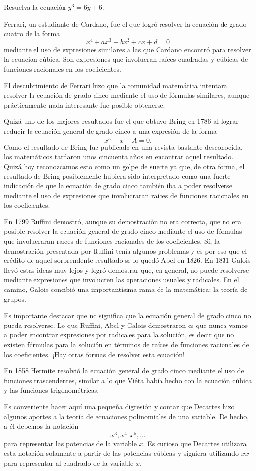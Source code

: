\begin{exercise}
	Resuelva la ecuación $y^3=6y+6$.	
\end{exercise}

Ferrari, un estudiante de Cardano, fue el que logró resolver la
ecuación de grado cuatro de la forma
\[
	x^4+ax^3+bx^2+cx+d=0
\]
mediante el uso de expresiones similares a las que Cardano encontró para
resolver la ecuación cúbica. Son expresiones que involucran raíces cuadradas y
cúbicas de funciones racionales en los coeficientes. 

El descubrimiento de Ferrari hizo que la comunidad matemática intentara
resolver la ecuación de grado cinco mediante el uso de fórmulas similares, aunque
prácticamente nada interesante fue posible obtenerse. 

Quizá uno de los mejores resultados fue el que obtuvo Bring en 1786 al lograr 
reducir la ecuación general de grado cinco a una expresión de la forma
\[
	x^5-x-A=0.
\]
Como el resultado de Bring fue publicado en una revista bastante desconocida,
los matemáticos tardaron unos cincuenta años en encontrar aquel resultado.
Quizá hoy reconozcamos esto como un golpe de suerte ya que, de otra forma, el
resultado de Bring posiblemente hubiera sido interpretado como una fuerte
indicación de que la ecuación de grado cinco también iba a poder resolverse
mediante el uso de expresiones que involucraran raíces de funciones racionales
en los coeficientes.

En 1799 Ruffini demostró, aunque su demostración no era correcta, que no era
posible resolver la ecuación general de grado cinco mediante el uso de fórmulas
que involucraran raíces de funciones racionales de los coeficientes. Sí, la
demostración presentada por Ruffini tenía algunos problemas y es por eso que el
crédito de aquel sorprendente resultado se lo quedó Abel en 1826.  En 1831
Galois llevó estas ideas muy lejos y logró demostrar que, en general, no puede
resolverse mediante expresiones que involucren las operaciones usuales y 
radicales. En el camino, Galois concibió una importantísima rama
de la matemática: la teoría de grupos.

Es importante destacar que no significa que la ecuación general de grado cinco
no pueda resolverse. Lo que Ruffini, Abel y Galois demostraron es que nunca
vamos a poder encontrar expresiones por radicales para la solución, es decir
que no existen fórmulas para la solución en términos de raíces de funciones
racionales de los coeficientes. ¡Hay otras formas de resolver esta ecuación!

En 1858 Hermite resolvió la ecuación general de grado cinco mediante el uso de
funciones trascendentes, similar a lo que Viéta había hecho con la ecuación
cúbica y las funciones trigonométricas. 

Es conveniente hacer aquí una pequeña digresión y contar que Decartes hizo
algunos aportes a la teoría de ecuaciones polinomiales de una variable. De
hecho, a él debemos la notación 
\[
	x^3,x^4,x^5,\dots
\]
para representar las potencias de la variable $x$. Es curioso que Decartes
utilizara esta notación solamente a partir de las potencias cúbicas y siguiera
utilizando $xx$ para representar al cuadrado de la variable $x$. 

